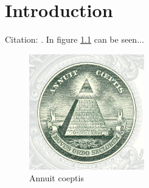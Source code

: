 \chapter{Introduction}

Citation: \cite{JohnDoe}.
\newline
In figure \ref{fig:annuit} can be seen...

\begin{figure}[htb]
\begin{center}
\includegraphics[width=5cm]{images/annuit.jpg}
\end{center}
\caption{Annuit coeptis}
\label{fig:annuit}
\end{figure}


